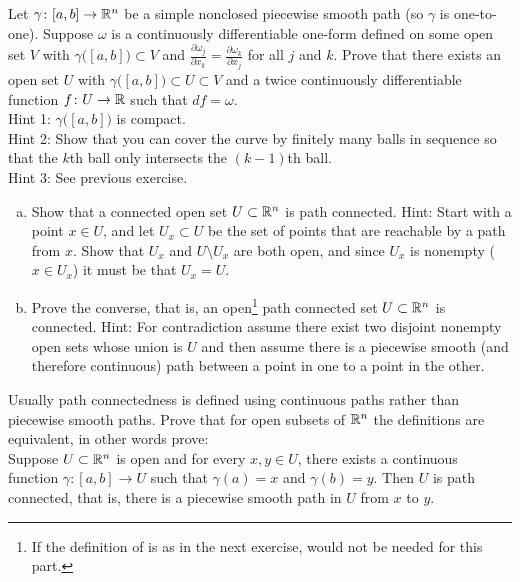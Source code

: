 \begin{exercise}[Hard]
Let $\gamma \colon [a,b] \to {\mathbb{R}}^n$ be a simple nonclosed piecewise smooth
path (so $\gamma$
is one-to-one).  Suppose $\omega$ is a continuously differentiable
one-form defined on some open
set $V$ with $\gamma\bigl([a,b]\bigr) \subset V$ and
$\frac{\partial \omega_j}{\partial x_k} = \frac{\partial \omega_k}{\partial
x_j}$
for all $j$ and $k$.  Prove that there exists an open set $U$
with $\gamma\bigl([a,b]\bigr) \subset U \subset V$ and
a twice continuously differentiable function $f \colon U \to {\mathbb{R}}$
such that $df = \omega$.
\\
Hint 1: $\gamma\bigl([a,b]\bigr)$ is compact.\\
Hint 2: Show that you can cover the curve by finitely many balls in sequence
so that the $k$th ball only intersects the $(k-1)$th ball.\\
Hint 3: See previous exercise.
\end{exercise}

\begin{exercise}
\pagebreak[2]
\leavevmode
\begin{enumerate}[a)]
\item
Show that a connected open set $U \subset {\mathbb{R}}^n$ is path connected.
Hint: Start with a
point $x \in U$, and let $U_x \subset U$ be the set of points that are
reachable by a path from $x$.  Show that $U_x$ and $U \setminus U_x$
are both open, and since $U_x$ is nonempty ($x \in U_x$) it must be
that $U_x = U$.
\item
Prove the converse, that is, an open\footnote{If the
definition of  is as in the next exercise,
 would not be needed for this part.}
path connected set $U \subset {\mathbb{R}}^n$ is
connected.  Hint: For contradiction assume there exist two disjoint nonempty open
sets whose union is $U$ and then assume there is a piecewise smooth (and therefore continuous)
path between a point in one to a point in the other.
\end{enumerate}
\end{exercise}

\begin{exercise}
Usually path connectedness is defined using continuous paths rather
than piecewise smooth paths.  Prove that for open subsets of ${\mathbb{R}}^n$
the definitions are equivalent, in
other words prove:\\
Suppose $U \subset {\mathbb{R}}^n$ is open and for every $x,y \in U$, there exists a continuous function
$\gamma \colon [a,b] \to U$ such that $\gamma(a) = x$ and $\gamma(b) = y$.
Then $U$ is path connected, that is, there is a piecewise smooth path in $U$ from
$x$ to $y$.
\end{exercise}

